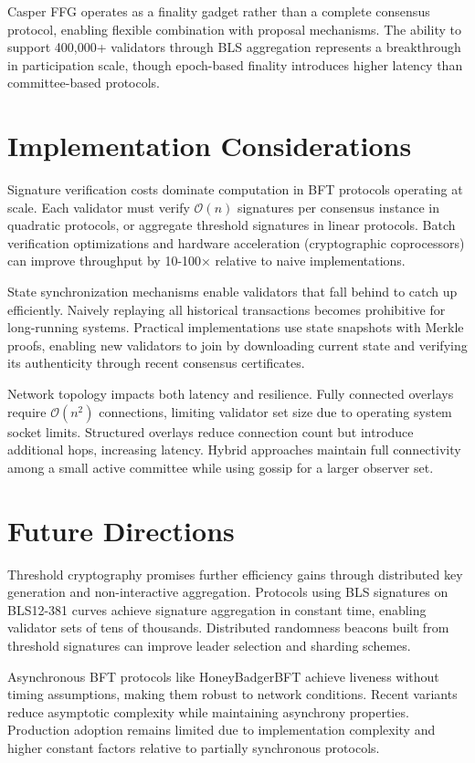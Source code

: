 \documentclass{article}
\begin{document}
Casper FFG operates as a finality gadget rather than a complete consensus protocol, enabling flexible combination with proposal mechanisms. The ability to support 400,000+ validators through BLS aggregation represents a breakthrough in participation scale, though epoch-based finality introduces higher latency than committee-based protocols.

\section{Implementation Considerations}

Signature verification costs dominate computation in BFT protocols operating at scale. Each validator must verify $\mathcal{O}(n)$ signatures per consensus instance in quadratic protocols, or aggregate threshold signatures in linear protocols. Batch verification optimizations and hardware acceleration (cryptographic coprocessors) can improve throughput by 10-100× relative to naive implementations.

State synchronization mechanisms enable validators that fall behind to catch up efficiently. Naively replaying all historical transactions becomes prohibitive for long-running systems. Practical implementations use state snapshots with Merkle proofs, enabling new validators to join by downloading current state and verifying its authenticity through recent consensus certificates.

Network topology impacts both latency and resilience. Fully connected overlays require $\mathcal{O}(n^2)$ connections, limiting validator set size due to operating system socket limits. Structured overlays reduce connection count but introduce additional hops, increasing latency. Hybrid approaches maintain full connectivity among a small active committee while using gossip for a larger observer set.

\section{Future Directions}

Threshold cryptography promises further efficiency gains through distributed key generation and non-interactive aggregation. Protocols using BLS signatures on BLS12-381 curves achieve signature aggregation in constant time, enabling validator sets of tens of thousands. Distributed randomness beacons built from threshold signatures can improve leader selection and sharding schemes.

Asynchronous BFT protocols like HoneyBadgerBFT achieve liveness without timing assumptions, making them robust to network conditions. Recent variants reduce asymptotic complexity while maintaining asynchrony properties. Production adoption remains limited due to implementation complexity and higher constant factors relative to partially synchronous protocols.
\end{document}
